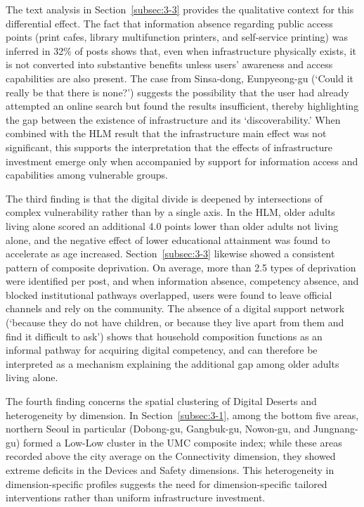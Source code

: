 The text analysis in Section~\ref{subsec:3-3} provides the qualitative context for this differential effect. The fact that information absence regarding public access points (print cafes, library multifunction printers, and self-service printing) was inferred in 32\% of posts shows that, even when infrastructure physically exists, it is not converted into substantive benefits unless users' awareness and access capabilities are also present. The case from Sinsa-dong, Eunpyeong-gu (`Could it really be that there is none?') suggests the possibility that the user had already attempted an online search but found the results insufficient, thereby highlighting the gap between the existence of infrastructure and its `discoverability.' When combined with the HLM result that the infrastructure main effect was not significant, this supports the interpretation that the effects of infrastructure investment emerge only when accompanied by support for information access and capabilities among vulnerable groups.

The third finding is that the digital divide is deepened by intersections of complex vulnerability rather than by a single axis. In the HLM, older adults living alone scored an additional 4.0 points lower than older adults not living alone, and the negative effect of lower educational attainment was found to accelerate as age increased. Section~\ref{subsec:3-3} likewise showed a consistent pattern of composite deprivation. On average, more than 2.5 types of deprivation were identified per post, and when information absence, competency absence, and blocked institutional pathways overlapped, users were found to leave official channels and rely on the community. The absence of a digital support network (`because they do not have children, or because they live apart from them and find it difficult to ask') shows that household composition functions as an informal pathway for acquiring digital competency, and can therefore be interpreted as a mechanism explaining the additional gap among older adults living alone.

The fourth finding concerns the spatial clustering of Digital Deserts and heterogeneity by dimension. In Section~\ref{subsec:3-1}, among the bottom five areas, northern Seoul in particular (Dobong-gu, Gangbuk-gu, Nowon-gu, and Jungnang-gu) formed a Low-Low cluster in the UMC composite index; while these areas recorded above the city average on the Connectivity dimension, they showed extreme deficits in the Devices and Safety dimensions. This heterogeneity in dimension-specific profiles suggests the need for dimension-specific tailored interventions rather than uniform infrastructure investment.

